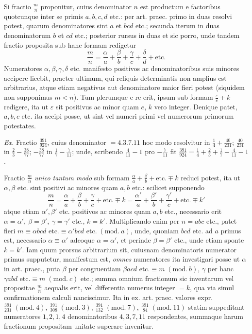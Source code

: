 Si fractio \(\frac mn\) proponitur, cuius denominator \(n\) est productum e factoribus quotcunque inter se primis \(a,b,c,d\) etc.: per art. praec. primo in duas resolvi potest, quarum denominatores sint \(a\) et \(bcd\) etc.; secunda iterum in duas denominatorum \(b\) et \(cd\) etc.; posterior rursus in duas et sic porro, unde tandem fractio proposita sub hanc formam redigetur \[\frac mn=\frac\alpha a+\frac\beta b+\frac\gamma c+\frac\delta d+\text{etc.}\]
Numeratores \(\alpha,\beta,\gamma,\delta\) etc. manifesto positivos ac denominatoribus suis minores accipere licebit, praeter ultimum, qui reliquis determinatis non amplius est arbitrarius, atque etiam negativus aut denominatore maior fieri potest (siquidem non supponimus \(m<n\)). Tum plerumque e re erit, ipsum sub formam \(\frac\varepsilon e\mp k\) redigere, ita ut \(\varepsilon\) sit positivus ac minor quam \(e\), \(k\) vero integer. Denique patet, \(a,b,c\) etc. ita accipi posse, ut sint vel numeri primi vel numerorum primorum potestates.

\textit{Ex.} Fractio \(\frac{391}{924}\), cuius denominator \(=4.3.7.11\) hoc modo resolvitur in \(\frac14+\frac{40}{231}\); \(\frac{40}{231}\) in \(\frac23-\frac{38}{77}\); \(-\frac{38}{77}\) in \(\frac17-\frac7{11}\); unde, scribendo \(\frac4{11}-1\) pro \(-\frac7{11}\) fit \(\frac{391}{924}=\frac14+\frac23+\frac17+\frac4{11}-1\).

Fractio \(\frac mn\) \textit{unico tantum modo} sub formam \(\frac\alpha a+\frac\beta b+\text{etc.}\mp k\) reduci potest, ita ut \(\alpha,\beta\) etc. sint positivi ac minores quam \(a,b\) etc.: scilicet supponendo \[\frac mn=\frac\alpha a+\frac\beta b+\frac\gamma c+\text{etc.}\mp k=\frac{\alpha'}a+\frac{\beta'}b+\frac{\gamma'}c+\text{etc.}\mp k'\]
atque etiam \(\alpha',\beta'\) etc. positivos ac minores quam \(a,b\) etc., necessario erit \(\alpha=\alpha',\ \beta=\beta',\ \gamma=\gamma'\) etc., \(k=k'\). Multiplicando enim per \(n=abc\) etc., patet fieri \(m\equiv\alpha bcd\text{ etc.}\equiv\alpha'bcd\text{ etc.}\; (\mathrm{mod}.\ a)\), unde, quoniam \(bcd\) etc. ad \(a\) primus est, necessario \(\alpha\equiv\alpha'\) adeoque \(\alpha=\alpha'\), et perinde \(\beta=\beta'\) etc., unde etiam sponte \(k=k'\). Iam quum prorsus arbitrarium sit, cuiusnam denominatoris numerator primus supputetur, manifestum est, \textit{omnes} numeratores ita investigari posse ut \(\alpha\) in art. praec., puta \(\beta\) per congruentiam \(\beta acd\text{ etc.}\equiv m\; (\mathrm{mod}.\ b)\), \(\gamma\) per hanc \(\gamma abd\text{ etc.}\equiv m\; (\mathrm{mod}.\ c)\) etc.; summa omnium fractionum sic inventarum vel propositae \(\frac mn\) aequalis erit, vel differentia numerus integer \(=k\), qua via simul confirmationem calculi nanciscimur. Ita in ex. art. praec. valores expr. \(\frac{391}{231}\; (\mathrm{mod}.\ 4)\), \(\frac{391}{308}\; (\mathrm{mod}.\ 3)\), \(\frac{391}{132}\; (\mathrm{mod}.\ 7)\), \(\frac{391}{84}\; (\mathrm{mod}.\ 11)\) statim suppeditant numeratores \(1,2,1,4\) denominatoribus \(4,3,7,11\) respondentes, summaque harum fractionum propositam unitate superare invenitur.

